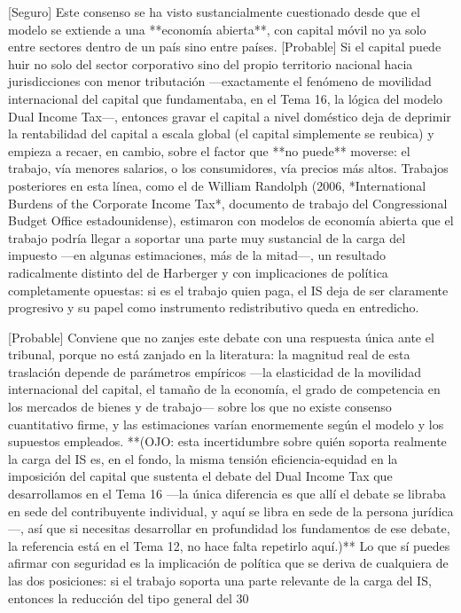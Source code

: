 \documentclass[10pt,a4paper]{article}
\begin{document}
[Seguro] Este consenso se ha visto sustancialmente cuestionado desde que el modelo se extiende a una **economía abierta**, con capital móvil no ya solo entre sectores dentro de un país sino entre países. [Probable] Si el capital puede huir no solo del sector corporativo sino del propio territorio nacional hacia jurisdicciones con menor tributación —exactamente el fenómeno de movilidad internacional del capital que fundamentaba, en el Tema 16, la lógica del modelo Dual Income Tax—, entonces gravar el capital a nivel doméstico deja de deprimir la rentabilidad del capital a escala global (el capital simplemente se reubica) y empieza a recaer, en cambio, sobre el factor que **no puede** moverse: el trabajo, vía menores salarios, o los consumidores, vía precios más altos. Trabajos posteriores en esta línea, como el de William Randolph (2006, *International Burdens of the Corporate Income Tax*, documento de trabajo del Congressional Budget Office estadounidense), estimaron con modelos de economía abierta que el trabajo podría llegar a soportar una parte muy sustancial de la carga del impuesto —en algunas estimaciones, más de la mitad—, un resultado radicalmente distinto del de Harberger y con implicaciones de política completamente opuestas: si es el trabajo quien paga, el IS deja de ser claramente progresivo y su papel como instrumento redistributivo queda en entredicho.

[Probable] Conviene que no zanjes este debate con una respuesta única ante el tribunal, porque no está zanjado en la literatura: la magnitud real de esta traslación depende de parámetros empíricos —la elasticidad de la movilidad internacional del capital, el tamaño de la economía, el grado de competencia en los mercados de bienes y de trabajo— sobre los que no existe consenso cuantitativo firme, y las estimaciones varían enormemente según el modelo y los supuestos empleados. **(OJO: esta incertidumbre sobre quién soporta realmente la carga del IS es, en el fondo, la misma tensión eficiencia-equidad en la imposición del capital que sustenta el debate del Dual Income Tax que desarrollamos en el Tema 16 —la única diferencia es que allí el debate se libraba en sede del contribuyente individual, y aquí se libra en sede de la persona jurídica—, así que si necesitas desarrollar en profundidad los fundamentos de ese debate, la referencia está en el Tema 12, no hace falta repetirlo aquí.)** Lo que sí puedes afirmar con seguridad es la implicación de política que se deriva de cualquiera de las dos posiciones: si el trabajo soporta una parte relevante de la carga del IS, entonces la reducción del tipo general del 30%
\end{document}
